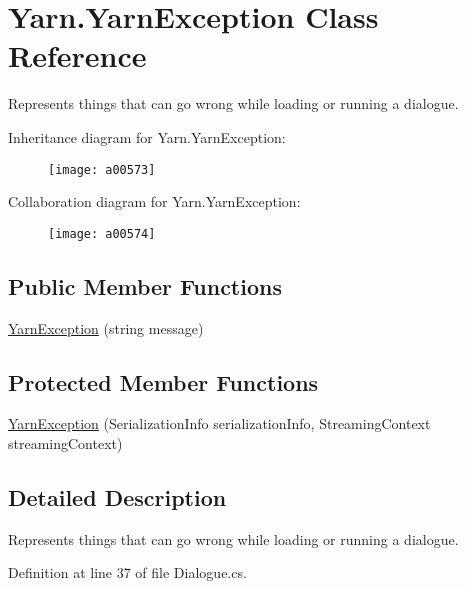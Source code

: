 \hypertarget{a00171}{\section{Yarn.\-Yarn\-Exception Class Reference}
\label{a00171}
}


Represents things that can go wrong while loading or running a dialogue.  




Inheritance diagram for Yarn.\-Yarn\-Exception\-:
\nopagebreak
\begin{figure}[H]
\begin{center}
\leavevmode
\texttt{[image: a00573]}
\end{center}
\end{figure}


Collaboration diagram for Yarn.\-Yarn\-Exception\-:
\nopagebreak
\begin{figure}[H]
\begin{center}
\leavevmode
\texttt{[image: a00574]}
\end{center}
\end{figure}
\subsection*{Public Member Functions}
\begin{DoxyCompactItemize}
\item 
\hyperlink{a00171_aa4a1dc51efdfa238aad7f20d76710fd1}{Yarn\-Exception} (string message)
\end{DoxyCompactItemize}
\subsection*{Protected Member Functions}
\begin{DoxyCompactItemize}
\item 
\hyperlink{a00171_a4230584809bc10d063385a96cc23aeb8}{Yarn\-Exception} (Serialization\-Info serialization\-Info, Streaming\-Context streaming\-Context)
\end{DoxyCompactItemize}


\subsection{Detailed Description}
Represents things that can go wrong while loading or running a dialogue. 

Definition at line 37 of file Dialogue.\-cs.



